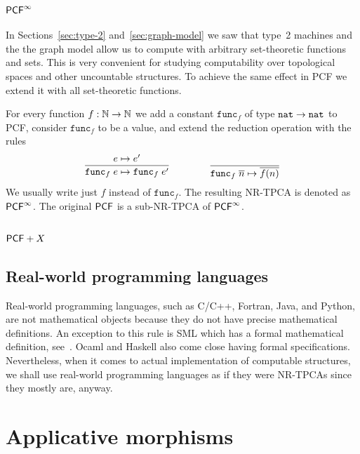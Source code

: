\subsubsection[\texorpdfstring{$\PCFinf$}{PCF-infinity}]{$\PCFinf$}

In Sections~\ref{sec:type-2} and~\ref{sec:graph-model} we saw that
type~2 machines and the the graph model allow us to compute with
arbitrary set-theoretic functions and sets. This is very convenient
for studying computability over topological spaces and other
uncountable structures. To achieve the same effect in PCF we extend it
with all set-theoretic functions.

For every function $f : \mathbb{N} \to \mathbb{N}$ we add a constant $\mathtt{func}_f$
of type $\mathtt{nat} \to \mathtt{nat}$ to PCF, consider $\mathtt{func}_f$ to be a
value, and extend the reduction operation with the rules
%
\begin{equation*}
  \begin{gathered}\dfrac{e \mapsto e'}{\mathtt{func}_f\;e \mapsto \mathtt{func}_f\;e'}\end{gathered}
  \qquad\qquad
  \dfrac{}{\mathtt{func}_f\;\overline{n} \mapsto \overline{f(n)}}
\end{equation*}
%
We usually write just $f$ instead of $\mathtt{func}_f$. The resulting
NR-TPCA is denoted as $\PCFinf$. The original $\mathsf{PCF}$ is a sub-NR-TPCA
of $\PCFinf$.

\subsubsection[\texorpdfstring{$\PCF + X$}{PCF + X}]{$\PCF + X$}
\label{sec:pcf-x}


\subsection{Real-world programming languages}
\label{sec:programming-languages}

Real-world programming languages, such as C/C++, Fortran, Java, and
Python, are not mathematical objects because they do not have precise
mathematical definitions. An exception to this rule is SML which has a
formal mathematical definition, see~. Ocaml and
Haskell also come close having formal specifications. Nevertheless,
when it comes to actual implementation of computable structures, we
shall use real-world programming languages as if they were NR-TPCAs
since they mostly are, anyway.


\section{Applicative morphisms}
\label{sec:appl-morph}




